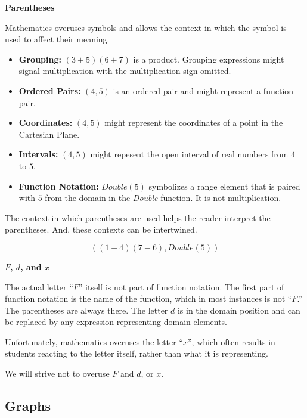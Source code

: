 \documentclass{ximera}
\begin{document}
\begin{notation}  \textbf{\textcolor{red!50!green}{Parentheses}}  


Mathematics overuses symbols and allows the context in which the symbol is used to affect their meaning.
	\begin{itemize}
		\item \textbf{Grouping:} $(3+5)(6+7)$ is a product.  Grouping expressions might signal multiplication with the multiplication sign omitted.
		\item \textbf{Ordered Pairs:} $(4, 5)$ is an ordered pair and might represent a function pair.
		\item \textbf{Coordinates:} $(4, 5)$ might represent the coordinates of a point in the Cartesian Plane.
		\item \textbf{Intervals:} $(4, 5)$ might repesent the open interval of real numbers from $4$ to $5$.
		\item \textbf{Function Notation:} $Double(5)$ symbolizes a range element that is paired with $5$ from the domain in the \textit{Double} function. It is not multiplication.
	\end{itemize}


The context in which parentheses are used helps the reader interpret the parentheses.  And, these contexts can be intertwined.

\[  ((1+4)(7-6), Double(5))    \]
\end{notation}




\begin{warning} \textbf{\textcolor{red!70!black}{$F$, $d$, and $x$}}  

The actual letter ``$F$'' itself is not part of function notation.  The first part of function notation is the name of the function, which in most instances is not ``$F$.'' The parentheses are always there.  The letter $d$ is in the domain position and can be replaced by any expression representing domain elements.  


Unfortunately, mathematics overuses the letter ``$x$'', which often results in students reacting to the letter itself, rather than what it is representing.

We will strive not to overuse $F$ and $d$, or $x$.
\end{warning}









\subsection*{Graphs}
\end{document}
